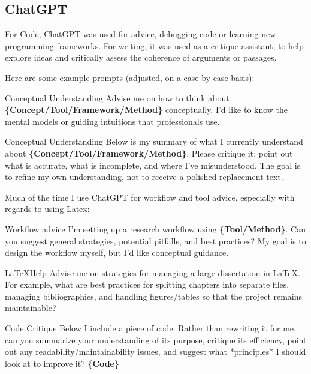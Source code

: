 \begin{appendices}
  \subsection{ChatGPT}
  For Code, ChatGPT was used for advice, debugging code or learning new programming frameworks.
  For writing, it was used as a critique assistant, to help explore ideas and critically assess the coherence of arguments or passages.

  Here are some example prompts (adjusted, on a case-by-case basis):
  \begin{prompt}{Conceptual Understanding}
    Advise me on how to think about \textbf{\{Concept/Tool/Framework/Method\}} conceptually.
    I’d like to know the mental models or guiding intuitions that professionals use.
  \end{prompt}
  \begin{prompt}{Conceptual Understanding}
    Below is my summary of what I currently understand about \textbf{\{Concept/Tool/Framework/Method\}}.
    Please critique it: point out what is accurate, what is incomplete, and
    where I’ve misunderstood. The goal is to refine my own understanding,
    not to receive a polished replacement text.
  \end{prompt}

  Much of the time I use ChatGPT for workflow and tool advice, especially with regards to using Latex:

  \begin{prompt}{Workflow advice}
    I’m setting up a research workflow using \textbf{\{Tool/Method\}}.
    Can you suggest general strategies, potential pitfalls, and best practices?
    My goal is to design the workflow myself, but I’d like conceptual guidance.
  \end{prompt}

  \begin{prompt}{\LaTeX Help}
    Advise me on strategies for managing a large dissertation in LaTeX.
    For example, what are best practices for splitting chapters into separate files,
    managing bibliographies, and handling figures/tables so that the project
    remains maintainable?
  \end{prompt}

  \begin{prompt}{Code Critique}
    Below I include a piece of code.
    Rather than rewriting it for me,
    can you summarize your understanding of its purpose, critique its efficiency, point out
    any readability/maintainability issues, and suggest what *principles* I should look at to improve it?
    \textbf{\{Code\}}
  \end{prompt}


\end{appendices}

